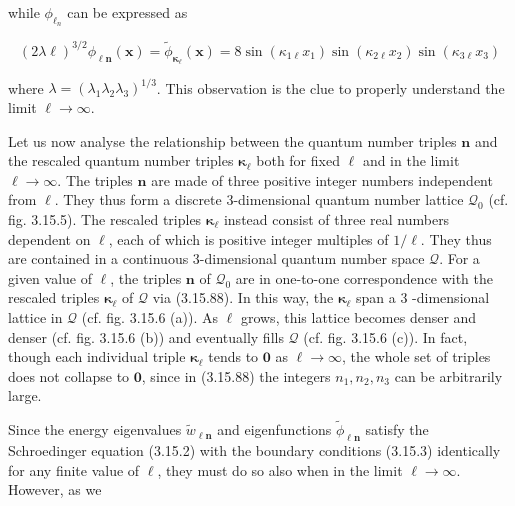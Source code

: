 \documentclass{article}
\begin{document}
while $\phi_{\ell_{n}}$ can be expressed as
 
\begin{equation*}
(2 \lambda \ell)^{3 / 2} \phi_{\ell \boldsymbol{n}}(\boldsymbol{x})=\tilde{\phi}_{\boldsymbol{\kappa}_{\ell}}(\boldsymbol{x})=8 \sin \left(\kappa_{1 \ell} x_{1}\right) \sin \left(\kappa_{2 \ell} x_{2}\right) \sin \left(\kappa_{3 \ell} x_{3}\right) \tag{3.15.90}
\end{equation*}
 
where $\lambda=\left(\lambda_{1} \lambda_{2} \lambda_{3}\right)^{1 / 3}$. This observation is the clue to properly understand the limit $\ell \rightarrow \infty$.

Let us now analyse the relationship between the quantum number triples $\boldsymbol{n}$ and the rescaled quantum number triples $\boldsymbol{\kappa}_{\ell}$ both for fixed $\ell$ and in the limit $\ell \rightarrow \infty$. The triples $\boldsymbol{n}$ are made of three positive integer numbers independent from $\ell$. They thus form a discrete 3-dimensional quantum number lattice $\mathcal{Q}_{0}$ (cf. fig. 3.15.5). The rescaled triples $\boldsymbol{\kappa}_{\ell}$ instead consist of three real numbers dependent on $\ell$, each of which is positive integer multiples of $1 / \ell$. They thus are contained in a continuous 3-dimensional quantum number space $\mathcal{Q}$. For a given value of $\ell$, the triples $\boldsymbol{n}$ of $\mathcal{Q}_{0}$ are in one-to-one correspondence with the rescaled triples $\boldsymbol{\kappa}_{\ell}$ of $\mathcal{Q}$ via (3.15.88). In this way, the $\boldsymbol{\kappa}_{\ell}$ span a 3 -dimensional lattice in $\mathcal{Q}$ (cf. fig. 3.15.6 (a)). As $\ell$ grows, this lattice becomes denser and denser (cf. fig. 3.15.6 (b)) and eventually fills $\mathcal{Q}$ (cf. fig. 3.15.6 (c)). In fact, though each individual triple $\boldsymbol{\kappa}_{\ell}$ tends to $\mathbf{0}$ as $\ell \rightarrow \infty$, the whole set of triples does not collapse to $\mathbf{0}$, since in (3.15.88) the integers $n_{1}, n_{2}, n_{3}$ can be arbitrarily large.

Since the energy eigenvalues $\tilde{w}_{\ell \boldsymbol{n}}$ and eigenfunctions $\tilde{\phi}_{\ell \boldsymbol{n}}$ satisfy the Schroedinger equation (3.15.2) with the boundary conditions (3.15.3) identically for any finite value of $\ell$, they must do so also when in the limit $\ell \rightarrow \infty$. However, as we
\end{document}
